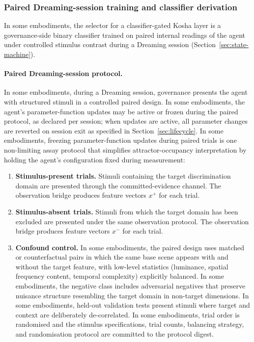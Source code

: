 \documentclass[a4paper,12pt]{article}
\begin{document}
\subsubsection{Paired Dreaming-session training and classifier derivation}
\label{sec:classifier-training}

In some embodiments, the selector for a classifier-gated Kosha layer
is a governance-side binary classifier trained on paired internal
readings of the agent under controlled stimulus contrast during a
Dreaming session (Section~\ref{sec:state-machine}).

\paragraph{Paired Dreaming-session protocol.}
In some embodiments, during a Dreaming session, governance presents
the agent with structured stimuli in a controlled paired design. In
some embodiments, the agent's parameter-function updates may be
active or frozen during the paired protocol, as declared per session;
when updates are active, all parameter changes are reverted on session
exit as specified in Section~\ref{sec:lifecycle}. In some
embodiments, freezing parameter-function updates during paired trials
is one non-limiting assay protocol that simplifies attractor-occupancy
interpretation by holding the agent's configuration fixed during
measurement:

\begin{enumerate}
  \item \textbf{Stimulus-present trials.} Stimuli containing the
    target discrimination domain are presented through the
    committed-evidence channel. The observation bridge produces
    feature vectors $x^+$ for each trial.
  \item \textbf{Stimulus-absent trials.} Stimuli from which the
    target domain has been excluded are presented under the same
    observation protocol. The observation bridge produces feature
    vectors $x^-$ for each trial.
  \item \textbf{Confound control.} In some embodiments, the paired
    design uses matched or counterfactual pairs in which the same
    base scene appears with and without the target feature, with
    low-level statistics (luminance, spatial frequency content,
    temporal complexity) explicitly balanced. In some embodiments,
    the negative class includes adversarial negatives that preserve
    nuisance structure resembling the target domain in non-target
    dimensions. In some embodiments, held-out validation tests
    present stimuli where target and context are deliberately
    de-correlated. In some embodiments, trial order is randomised
    and the stimulus specifications, trial counts, balancing
    strategy, and randomisation protocol are committed to the
    protocol digest.
\end{enumerate}
\end{document}
